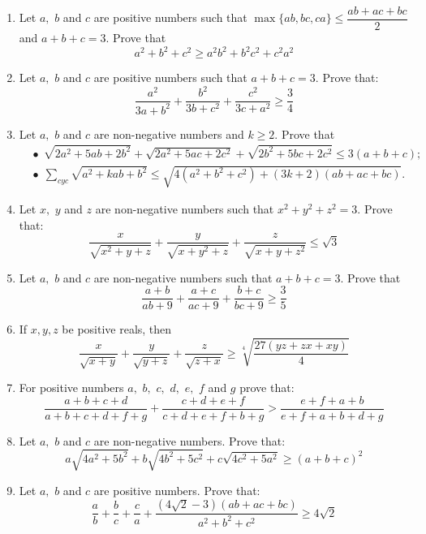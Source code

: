 \documentclass{article}
\begin{document}
\begin{enumerate}
\item  Let $ a,$ $ b$ and $ c$ are positive numbers  such that
 $ \max\{ab,bc,ca\}\leq\dfrac  {ab + ac + bc}{2}$ and $ a + b + c = 3.$ Prove that
\[ a^2 + b^2 + c^2 \geq a^2b^2 + b^2c^2 + c^2a^2
\]

\item  Let $ a,$ $ b$ and $ c$ are positive numbers such that $ a+b+c=3.$ Prove that:
\[ \frac {a^2}{3a+b^2}+\frac {b^2}{3b+c^2}+\frac {c^2}{3c+a^2}\geq\frac {3}{4}\]

\item  Let $ a,$ $ b$ and $ c$ are non-negative numbers and $ k\geq2.$ Prove that
\[\begin{aligned}& \bullet \ \ \sqrt {2a^2 + 5ab + 2b^2} + \sqrt {2a^2 + 5ac + 2c^2} + \sqrt {2b^2 + 5bc + 2c^2}\leq3(a + b + c);\\&\bullet \ \ \sum_{cyc}\sqrt {a^2 + kab + b^2}\leq\sqrt {4(a^2 + b^2 + c^2) + (3k + 2)(ab + ac + bc)}.\end{aligned}\]

\item Let $ x,$ $ y$ and $ z$ are non-negative numbers such that $ x^2+y^2+z^2=3.$ Prove that:
\[ \frac {x}{\sqrt{x^{2}+y+z}}+\frac {y}{\sqrt{x+y^{2}+z}}+\frac {z}{\sqrt{x+y+z^{2}}} \leq \sqrt{3}\]

\item  Let $ a,$ $ b$ and $ c$ are non-negative numbers such that $ a + b + c = 3.$ Prove that
\[ \frac  {a + b}{ab + 9} + \frac  {a + c}{ac + 9} + \frac  {b + c}{bc + 9}\geq\frac  {3}{5}
\]

\item  If $ x,y,z$ be positive reals, then
\[ \frac  {x}{\sqrt {x + y}} + \frac  {y}{\sqrt {y + z}} + \frac  {z}{\sqrt {z + x}}\geq\sqrt [4]{\frac  {27(yz + zx + xy)}{4}}
\]

\item  For positive numbers $ a,$ $ b,$ $ c,$ $ d,$ $ e,$ $ f$ and $ g$ prove that:
\[ \frac  {a+b+c+d} {a+b+c+d+f+g} +\frac  {c+d+e+f} {c+d+e+f+b+g} > \frac  {e+f+a+b} {e+f+a+b+d+g}\]

\item  Let $ a,$ $ b$ and $ c$ are non-negative numbers. Prove that:
\[ a\sqrt{4a^2+5b^2}+b\sqrt{4b^2+5c^2}+c\sqrt{4c^2+5a^2}\geq(a+b+c)^2\]

\item Let $ a,$ $ b$ and $ c$ are positive numbers. Prove that:
\[ \frac  {a}{b} + \frac  {b}{c} + \frac  {c}{a} + \frac  {(4\sqrt2 - 3)(ab + ac + bc)}{a^2 + b^2 + c^2}\geq4\sqrt2
\]


\end{enumerate}
\end{document}

